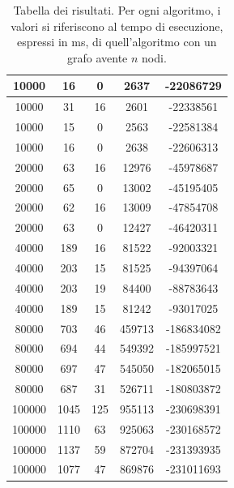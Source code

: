 \documentclass[a4paper]{article}
\begin{document}
\begin{table}[H]
\begin{minipage}[t]{10cm}
\begin{tabular}{|c|c|c|c|c|}
      10000         & 16            & 0                   & 2637             & -22086729    \\ \hline
      10000         & 31            & 16                  & 2601             & -22338561    \\ \hline
      10000         & 15            & 0                   & 2563             & -22581384    \\ \hline
      10000         & 16            & 0                   & 2638             & -22606313    \\ \hline
      20000         & 63            & 16                  & 12976            & -45978687    \\ \hline
      20000         & 65            & 0                   & 13002            & -45195405    \\ \hline
      20000         & 62            & 16                  & 13009            & -47854708    \\ \hline
      20000         & 63            & 0                   & 12427            & -46420311    \\ \hline
      40000         & 189           & 16                  & 81522            & -92003321    \\ \hline
      40000         & 203           & 15                  & 81525            & -94397064    \\ \hline
      40000         & 203           & 19                  & 84400            & -88783643    \\ \hline
      40000         & 189           & 15                  & 81242            & -93017025    \\ \hline
      80000         & 703           & 46                  & 459713           & -186834082   \\ \hline
      80000         & 694           & 44                  & 549392           & -185997521   \\ \hline
      80000         & 697           & 47                  & 545050           & -182065015   \\ \hline
      80000         & 687           & 31                  & 526711           & -180803872   \\ \hline
      100000        & 1045          & 125                 & 955113           & -230698391   \\ \hline
      100000        & 1110          & 63                  & 925063           & -230168572   \\ \hline
      100000        & 1137          & 59                  & 872704           & -231393935   \\ \hline
      100000        & 1077          & 47                  & 869876           & -231011693   \\ \hline
    \end{tabular}
  \end{minipage}
  \caption{Tabella dei risultati. Per ogni algoritmo, i valori si riferiscono al tempo di esecuzione, espressi in ms, di quell'algoritmo con un grafo avente $n$ nodi.}
  \label{t1}
\end{table}
\end{document}
